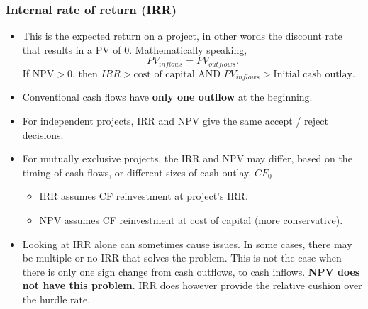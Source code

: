 \documentclass[../notes_compiled.tex]{subfiles}
\begin{document}
\subsubsection{Internal rate of return (IRR)}
\label{irr}
\begin{itemize}
\item This is the expected return on a project, in other words the discount rate that results in a PV of 0. Mathematically speaking, 
\begin{equation*}
PV_{inflows} = PV_{outflows}.
\end{equation*}
If $\mathrm{NPV}>0$, then $IRR>\text{cost of capital}$ AND $PV_{inflows}>\text{Initial cash outlay}$.
\item Conventional cash flows have \textbf{only one outflow} at the beginning.
\item For independent projects, IRR and NPV give the same accept / reject decisions.
\item For mutually exclusive projects, the IRR and NPV may differ, based on the timing of cash flows, or different sizes of cash outlay, $CF_{0}$
\begin{itemize}
\item IRR assumes CF reinvestment at project's IRR.
\item NPV assumes CF reinvestment at cost of capital (more conservative).
\end{itemize}
\item Looking at IRR alone can sometimes cause issues. In some cases, there may be multiple or no IRR that solves the problem. This is not the case when there is only one sign change from cash outflows, to cash inflows. \textbf{NPV does not have this problem}. IRR does however provide the relative cushion over the hurdle rate.
\end{itemize}
\end{document}
